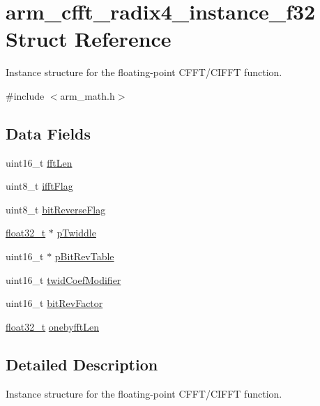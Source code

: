 \hypertarget{structarm__cfft__radix4__instance__f32}{}\section{arm\+\_\+cfft\+\_\+radix4\+\_\+instance\+\_\+f32 Struct Reference}
\label{structarm__cfft__radix4__instance__f32}


Instance structure for the floating-\/point C\+F\+F\+T/\+C\+I\+F\+FT function.  




{\ttfamily \#include $<$arm\+\_\+math.\+h$>$}

\subsection*{Data Fields}
\begin{DoxyCompactItemize}
\item 
uint16\+\_\+t \mbox{\hyperlink{structarm__cfft__radix4__instance__f32_ab8db3bbe7c61e6bb8ca2a55e3446e11a}{fft\+Len}}
\item 
uint8\+\_\+t \mbox{\hyperlink{structarm__cfft__radix4__instance__f32_ad6ca6e223f986ebfd94c5ee1e410aa73}{ifft\+Flag}}
\item 
uint8\+\_\+t \mbox{\hyperlink{structarm__cfft__radix4__instance__f32_a09a221a818c6d0e064557a99e2fe9a8b}{bit\+Reverse\+Flag}}
\item 
\mbox{\hyperlink{arm__math_8h_a4611b605e45ab401f02cab15c5e38715}{float32\+\_\+t}} $\ast$ \mbox{\hyperlink{structarm__cfft__radix4__instance__f32_aca581481fccdff0f557f54a3ef20d967}{p\+Twiddle}}
\item 
uint16\+\_\+t $\ast$ \mbox{\hyperlink{structarm__cfft__radix4__instance__f32_a46a2fb328199897af100fea0bfdf59aa}{p\+Bit\+Rev\+Table}}
\item 
uint16\+\_\+t \mbox{\hyperlink{structarm__cfft__radix4__instance__f32_afe772e5b5001c9d8e85032115a8df5bf}{twid\+Coef\+Modifier}}
\item 
uint16\+\_\+t \mbox{\hyperlink{structarm__cfft__radix4__instance__f32_a33386d95319dc3ee7097b3a8e52e01ec}{bit\+Rev\+Factor}}
\item 
\mbox{\hyperlink{arm__math_8h_a4611b605e45ab401f02cab15c5e38715}{float32\+\_\+t}} \mbox{\hyperlink{structarm__cfft__radix4__instance__f32_acf295a7b97b7d48a9cae4d1ab5ed00f6}{onebyfft\+Len}}
\end{DoxyCompactItemize}


\subsection{Detailed Description}
Instance structure for the floating-\/point C\+F\+F\+T/\+C\+I\+F\+FT function. 

